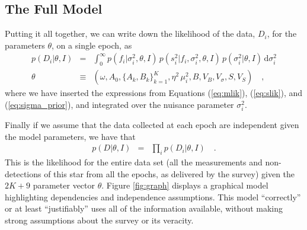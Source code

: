 \documentclass[12pt,preprint]{aastex}
\newcommand{\dd}{\mathrm{d}}
\newcommand{\fobs}{f_i}
\newcommand{\sobs}{s^2_i}
\begin{document}
\subsection{The Full Model}
\label{sec:full}
Putting it all together, we can write down the likelihood of the data, $D_i$, for the parameters $\theta$, on a single epoch, as
\begin{eqnarray}\displaystyle
\label{eqn:lik}
p(D_i|\theta,I) &=& \int_0^{\infty} p(\fobs |\sigma^2_i,\theta,I)\, p(\sobs | \fobs, \sigma^2_i,\theta,I)\, p(\sigma^2_i | \theta, I)\,\dd \sigma^2_i
\\
\label{eqn:likpar}
\theta &\equiv& (\omega, A_0, \{A_k, B_k\}_{k=1}^K, \eta^2\,\mu_i^2, B, V_B, V_{\sigma}, S, V_S) \quad ,
\end{eqnarray}
where we have inserted the expressions from Equations (\ref{eq:mlik}), (\ref{eq:slik}), and (\ref{eq:sigma_prior}), and integrated over the nuisance parameter $\sigma^2_i$.

Finally if we assume that the data collected at each epoch are independent given the model parameters, we have that
\begin{eqnarray}\displaystyle
\label{eqn:likfull}
p(D|\theta,I) &=& \prod_i p(D_i|\theta,I)
\quad.
\end{eqnarray}
This is the likelihood for the entire
data set (all the measurements and non-detections of this star from
all the epochs, as delivered by the survey) given the $2K + 9$ parameter vector $\theta$.
Figure \ref{fig:graph} displays a graphical model highlighting dependencies and 
independence assumptions. This model
``correctly'' or at least ``justifiably'' uses all of the information
available, without making strong assumptions about the survey or its
veracity.
\end{document}
